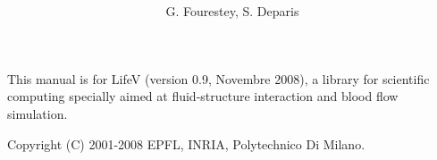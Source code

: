 \documentclass[a4paper, 12pt, report]{lifestyle}
\title{\lifetitle{LifeV Developer Manual}
}
\author{G. Fourestey, S. Deparis}
\date{}
\begin{document}
\maketitle

\phantom{dummy text}
\vfill
This manual is for LifeV (version 0.9, Novembre 2008), a library for scientific computing specially aimed at fluid-structure interaction and blood flow simulation.

Copyright (C) 2001-2008 EPFL, INRIA, Polytechnico Di Milano.

\tableofcontents

\listoffigures

\listoftables



%
%
%




\printindex
\end{document}
